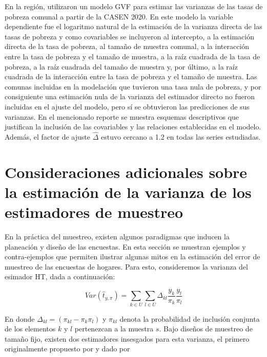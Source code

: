 \documentclass[
  12pt,
]{book}
\begin{document}
En la región, \citet{MDSF_CEPAL_2021} utilizaron un modelo GVF para estimar las varianzas de las tasas de pobreza comunal a partir de la CASEN 2020. En este modelo la variable dependiente fue el logaritmo natural de la estimación de la varianza directa de las tasas de pobreza y como covariables se incluyeron al intercepto, a la estimación directa de la tasa de pobreza, al tamaño de muestra comunal, a la interacción entre la tasa de pobreza y el tamaño de muestra, a la raíz cuadrada de la tasa de pobreza, a la raíz cuadrada del tamaño de muestra y, por último, a la raíz cuadrada de la interacción entre la tasa de pobreza y el tamaño de muestra. Las comunas incluidas en la modelación que tuvieron una tasa nula de pobreza, y por consiguiente una estimación nula de la varianza del estimador directo no fueron incluidas en el ajuste del modelo, pero sí se obtuvieron las predicciones de sus varianzas. En el mencionado reporte se muestra esquemas descriptivos que justifican la inclusión de las covariables y las relaciones establecidas en el modelo. Además, el factor de ajuste \(\hat\Delta\) estuvo cercano a 1.2 en todas las series estudiadas.

\hypertarget{consideraciones-adicionales-sobre-la-estimaciuxf3n-de-la-varianza-de-los-estimadores-de-muestreo}{%
\section{Consideraciones adicionales sobre la estimación de la varianza de los estimadores de muestreo}\label{consideraciones-adicionales-sobre-la-estimaciuxf3n-de-la-varianza-de-los-estimadores-de-muestreo}}

En la práctica del muestreo, existen algunos paradigmas que inducen la planeación y diseño de las encuestas. En esta sección se muestran ejemplos y contra-ejemplos que permiten ilustrar algunas mitos en la estimación del error de muestreo de las encuestas de hogares. Para esto, consideremos la varianza del esimador HT, dada a continuación:

\[
Var(\hat{t}_{y, \pi})=
\sum_{k\in U}\sum_{l\in U} \Delta_{kl}\frac{y_k}{\pi_k}\frac{y_l}{\pi_l}
\]

En donde \(\Delta_{kl} = (\pi_{kl}-\pi_k\pi_l)\) y \(\pi_{kl}\) denota la probabilidad de inclusión conjunta de los elementos \(k\) y \(l\) pertenezcan a la muestra \(s\). Bajo diseños de muestreo de tamaño fijo, existen dos estimadores insesgados para esta varianza, el primero originalmente propuesto por \citet{HT} y dado por
\end{document}
